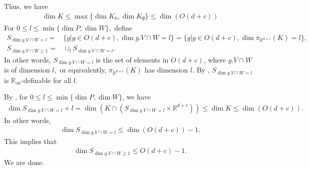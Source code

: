\documentclass[11pt,a4paper]{amsart}
\numberwithin{equation}{section}
\newcommand{\ran}{\mathbb{R}_{\operatorname{an}}}
\newcommand{\R}{\mathbb{R}}
\theoremstyle{plain}
\theoremstyle{definition}
\numberwithin{equation}{subsection}
\begin{document}
Thus, we have
\begin{align*}
	\dim K\le \max\{\dim K_0,\dim{K_{\not0}}\}\le \dim(O(d+c))
\end{align*}
For $0\le l\le \min\{\dim P,\dim W\},$ define\begin{align*}
	S_{\dim g.V\cap W= l}=&\{g|g\in O(d+c),\dim g.V\cap W=l\}=\{g|g\in O(d+c),\dim\pi_{\R^{d+c}}(K)=l\},\\
	S_{\dim g.V\cap W\ge 1}=&\cup_l S_{\dim g.V\cap W= l}.
\end{align*}
In other words, $S_{\dim g.V\cap W= l}$ is the set of elements in $O(d+c)$, where $g.V\cap W$ is of dimension $l,$ or equivalently, $\pi_{\R^{d+c}}(K)$ has dimension $l.$ By \cite[Theorem 3.18]{MComin}, $S_{\dim g.V\cap W= l}$ is $\ran$-definable for all $l.$

By \cite[Theorem 3.18, $A=S_{\dim g.V\cap W= l},d=l,m=(d+c)^2,n=d+c$]{MComin}, for $0\le l\le \min\{\dim P,\dim W\}$, we have
\begin{align*}
	\dim S_{\dim g.V\cap W= l}+l=\dim(K\cap (S_{\dim g.V\cap W= l}\times\R^{d+c}))\le\dim K\le\dim(O(d+c)).
\end{align*}
In other words,
\begin{align*}
	\dim S_{\dim g.V\cap W= l}\le \dim(O(d+c))-1.
\end{align*}
This implies that
\begin{align*}
	\dim S_{\dim g.V\cap W\ge 1}\le O(d+c)-1.
\end{align*}
We are done.
\end{document}
